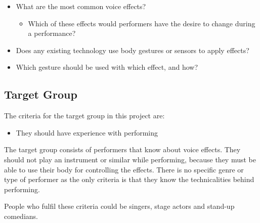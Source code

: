 \begin{itemize}
	\item What are the most common voice effects?
	\begin{itemize}
		\item Which of these effects would performers have the desire to change during a performance?
	\end{itemize}
	\item Does any existing technology use body gestures or sensors to apply effects?
	\item Which gesture should be used with which effect, and how?
\end{itemize}

\subsection{Target Group}
The criteria for the target group in this project are:

\begin{itemize}
	\item They should have experience with performing 
\end{itemize}

The target group consists of performers that know about voice effects. They should not play an instrument or similar while performing, because they must be able to use their body for controlling the effects. There is no specific genre or type of performer as the only criteria is that they know the technicalities behind performing.

People who fulfil these criteria could be singers, stage actors and stand-up comedians.